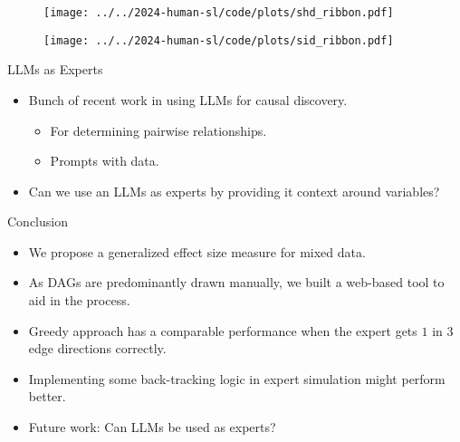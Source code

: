 \documentclass{beamer}
\begin{document}
\begin{frame}
	\begin{figure}
		\centering
		\texttt{[image: ../../2024-human-sl/code/plots/shd\_ribbon.pdf]}
	\end{figure}
\end{frame}

\begin{frame}
	\begin{figure}
		\centering
		\texttt{[image: ../../2024-human-sl/code/plots/sid\_ribbon.pdf]}
	\end{figure}
\end{frame}

\begin{frame}{LLMs as Experts}
	\begin{itemize}
		\item Bunch of recent work in using LLMs for causal discovery.
			\begin{itemize}
				\item For determining pairwise relationships.
				\item Prompts with data.
			\end{itemize}
		\item Can we use an LLMs as experts by providing it context around variables?
	\end{itemize}
\end{frame}

\begin{frame}{Conclusion}
	\begin{itemize}
		\item We propose a generalized effect size measure for mixed data.
		\item As DAGs are predominantly drawn manually, we built a web-based tool to aid in the process.
		\item Greedy approach has a comparable performance when the expert gets $ 1 $ in $ 3 $ edge directions correctly.
		\item Implementing some back-tracking logic in expert simulation might perform better.
		\item Future work: Can LLMs be used as experts?
	\end{itemize}
\end{frame}
\end{document}
